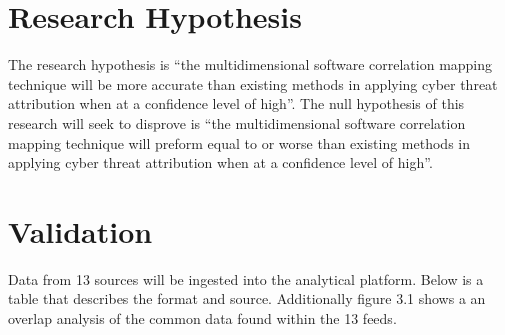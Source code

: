 \documentclass[12pt]{report}
\begin{document}

\section{Research Hypothesis} 
The research hypothesis is ``the multidimensional software correlation mapping technique will be more accurate than existing methods in applying cyber threat attribution when at a confidence level of high''. The null hypothesis of this research will seek to disprove is ``the multidimensional software correlation mapping technique will preform equal to or worse than existing methods in applying cyber threat attribution when at a confidence level of high''.

\section{Validation}
Data from 13 sources will be ingested into the analytical platform.  Below is a table that describes the format and source.  Additionally figure 3.1 shows a an overlap analysis of the common data found within the 13 feeds.
\end{document}

